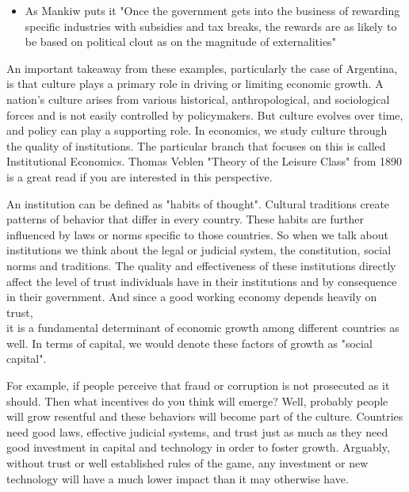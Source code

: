 \documentclass[10pt]{article}
\begin{document}
\begin{itemize}
  \item As Mankiw puts it "Once the government gets into the business of rewarding specific industries with subsidies and tax breaks, the rewards are as likely to be based on political clout as on the magnitude of externalities"
\end{itemize}

An important takeaway from these examples, particularly the case of Argentina, is that culture plays a primary role in driving or limiting economic growth. A nation's culture arises from various historical, anthropological, and sociological forces and is not easily controlled by policymakers. But culture evolves over time, and policy can play a supporting role. In economics, we study culture through the quality of institutions. The particular branch that focuses on this is called Institutional Economics. Thomas Veblen "Theory of the Leisure Class" from 1890 is a great read if you are interested in this perspective.

An institution can be defined as "habits of thought". Cultural traditions create patterns of behavior that differ in every country. These habits are further influenced by laws or norms specific to those countries. So when we talk about institutions we think about the legal or judicial system, the constitution, social norms and traditions. The quality and effectiveness of these institutions directly affect the level of trust individuals have in their institutions and by consequence in their government. And since a good working economy depends heavily on trust,\\
it is a fundamental determinant of economic growth among different countries as well. In terms of capital, we would denote these factors of growth as "social capital".

For example, if people perceive that fraud or corruption is not prosecuted as it should. Then what incentives do you think will emerge? Well, probably people will grow resentful and these behaviors will become part of the culture. Countries need good laws, effective judicial systems, and trust just as much as they need good investment in capital and technology in order to foster growth. Arguably, without trust or well established rules of the game, any investment or new technology will have a much lower impact than it may otherwise have.
\end{document}
